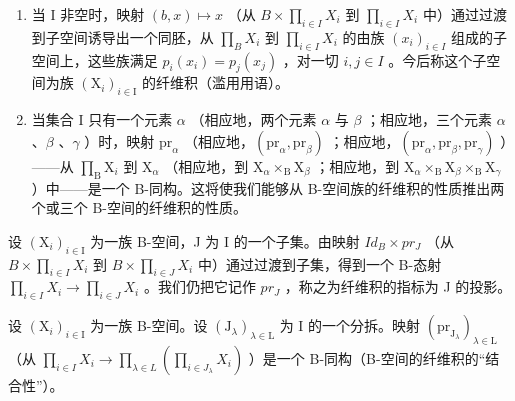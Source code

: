 \begin{enumerate}
\def\labelenumi{\arabic{enumi})}
\setcounter{enumi}{1}
\item
  当 I 非空时，映射 \((b,x)\mapsto x\) （从 \(B\times\prod_{i\in I}X_{i}\) 到 \(\prod_{i\in I}X_{i}\) 中）通过过渡到子空间诱导出一个同胚，从 \(\prod_{B}X_{i}\) 到 \(\prod_{i\in I}X_{i}\) 的由族 \((x_{i})_{i\in I}\) 组成的子空间上，这些族满足 \(p_{i}(x_{i})=p_{j}(x_{j})\) ，对一切 \(i,j\in I\) 。今后称这个子空间为族 \((\mathrm{X}_{i})_{i\in\mathrm{I}}\) 的纤维积（滥用用语）。
\item
  当集合 I 只有一个元素 \(\alpha\) （相应地，两个元素 \(\alpha\) 与 \(\beta\) ；相应地，三个元素 \(\alpha\) 、\(\beta\) 、\(\gamma\) ）时，映射 \(\mathrm{pr}_{\alpha}\) （相应地，\((\mathrm{pr}_{\alpha}, \mathrm{pr}_{\beta})\) ；相应地，\((\mathrm{pr}_{\alpha}, \mathrm{pr}_{\beta}, \mathrm{pr}_{\gamma})\) ）——从 \(\prod_{\mathrm{B}} \mathrm{X}_i\) 到 \(\mathrm{X}_{\alpha}\) （相应地，到 \(\mathrm{X}_{\alpha} \times_{\mathrm{B}} \mathrm{X}_{\beta}\) ；相应地，到 \(\mathrm{X}_{\alpha} \times_{\mathrm{B}} \mathrm{X}_{\beta} \times_{\mathrm{B}} \mathrm{X}_{\gamma}\) ）中——是一个 B-同构。这将使我们能够从 B-空间族的纤维积的性质推出两个或三个 B-空间的纤维积的性质。
\end{enumerate}

设 \((\mathrm{X}_{i})_{i\in\mathrm{I}}\) 为一族 B-空间，J 为 I 的一个子集。由映射 \(Id_{B}\times pr_{J}\) （从 \(B\times\prod_{i\in I}X_{i}\) 到 \(B\times\prod_{i\in J}X_{i}\) 中）通过过渡到子集，得到一个 B-态射 \(\prod_{i\in I}X_{i}\to\prod_{i\in J}X_{i}\) 。我们仍把它记作 \(pr_{J}\) ，称之为纤维积的指标为 J 的投影。

设 \((\mathrm{X}_{i})_{i\in\mathrm{I}}\) 为一族 B-空间。设 \((\mathrm{J}_{\lambda})_{\lambda\in\mathrm{L}}\) 为 I 的一个分拆。映射 \((\mathrm{pr}_{\mathrm{J}_{\lambda}})_{\lambda\in\mathrm{L}}\) （从 \(\prod_{i\in I}X_{i}\to\prod_{\lambda\in L}\left(\prod_{i\in J_{\lambda}}X_{i}\right)\) ）是一个 B-同构（B-空间的纤维积的“结合性”）。

